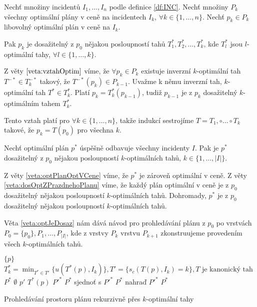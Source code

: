 \begin{veta}\label{veta:dosOptZPrazdnehoPlanu}
  Nechť množiny incidentů $I_1, \dots, I_n$ podle definice \ref{df:INC}.
  Nechť množiny $P_{k}$ všechny optimální plány v ceně na incidentech $I_k$, $\forall k \in \{ 1, \dots, n \}$.
  Nechť $p_k \in P_k$ libovolný optimální plán v ceně na $I_k$.

  Pak $p_k$ je dosažitelný z $p_0$ nějakou posloupností tahů $T^*_1, T^*_2, \dots, T^*_k$, kde $T^*_l$ jsou $l$-optimální tahy, $\forall l \in \{ 1, \dots, k \}$.
\end{veta}
\begin{dukaz}
  Z věty $\ref{veta:vztahOptim}$ víme, že $\forall p_k \in P_k$ existuje inverzní $k$-optimální tah $T^{-*} \in T^{-*}_k$ takový, že $T^{-*}(p_k) \in P_{k-1}$.
  Uvažme k němu inverzní tah, $k$-optimální tah $T^* \in T^{*}_k$.
  Platí $p_k = T^*_k(p_{k-1})$, tudiž $p_{k-1}$ je z $p_k$ dosažitelný $k$-optimálním tahem $T^*_k$.

  Tento vztah platí pro $\forall k \in \{ 1, \dots, n \}$, takže indukcí sestrojíme $T = T_1, \circ \dots \circ T_k$ takové, že $p_k = T(p_0)$ pro všechna $k$.
\end{dukaz}

\begin{veta}\label{veta:optJeDosaz}
  Nechť optimální plán $p^*$ úspěšně odbavuje všechny incidenty $I$.
  Pak je $p^*$ dosažitelný z $p_0$ nějakou posloupností $k$-optimálních tahů, $k \in \{ 1, \dots, |I| \}$.
\end{veta}
\begin{dukaz}
  Z věty \ref{veta:optPlanOptVCene} víme, že $p^*$ je zároveň optimální v ceně.
  Z věty \ref{veta:dosOptZPrazdnehoPlanu} víme, že každý plán optimální v ceně je z $p_0$ dosažitelný nějakou posloupností $k$-optimálních tahů.
  Dohromady, $p^*$ je z $p_0$ dosažitelný nějakou posloupností $k$-optimálních tahů.
\end{dukaz}

Věta \ref{veta:optJeDosaz} nám dává návod pro prohledávání plánu z $p_0$ po vrstvách $P_0 = \{ p_0\}, P_1, \dots, P_{|I|}$, 
kde z vrstvy $P_k$ vrstvu $P_{k+1}$ zkonstruujeme provedením všech $k$-optimálních tahů.

\begin{algorithm}[h]
  \begin{algorithmic}[1]
      \State \Return $\{ p \}$
    \EndIf
    \State $T^*_k = \min_{T^* \in T'} \{ u(T^*(p), I_k) \}, T' = \{ s_c(T(p), I_k) = k\}, \text{$T$ je kanonický tah}$
    \State $P^*$ \gets $\emptyset$
      \State $p'$ \gets $T^*(p)$
      \State $P'^*$ \gets {}
        \State $P^*$ sjednoť s $P'^*$
        \State $P^*$ nahraď $P'^*$
      \EndIf
    \EndFor
    \State \Return $P^*$
  \EndFunction
  \end{algorithmic}
  \caption{Prohledávání prostoru plánu rekurzivně přes $k$-optimální tahy}
  \label{alg:rekProhPlanu}
\end{algorithm}

